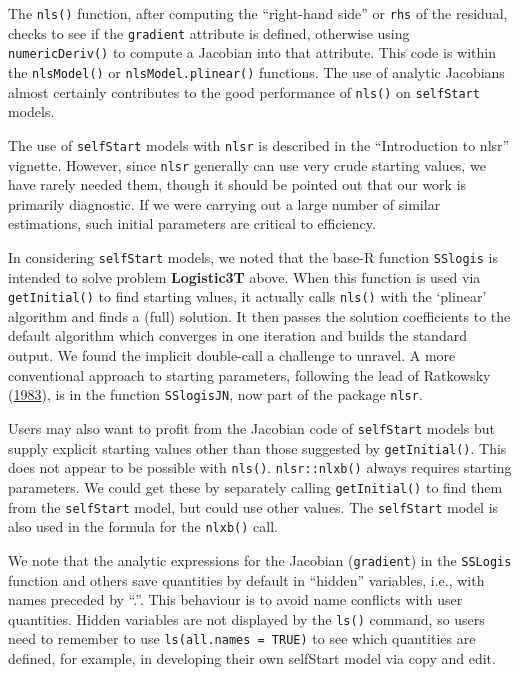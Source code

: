 \documentclass[
]{article}
\begin{document}
The \texttt{nls()} function, after computing the ``right-hand side'' or
\texttt{rhs} of the residual, checks to see if the \texttt{gradient}
attribute is defined, otherwise using \texttt{numericDeriv()} to compute
a Jacobian into that attribute. This code is within the
\texttt{nlsModel()} or \texttt{nlsModel.plinear()} functions. The use of
analytic Jacobians almost certainly contributes to the good performance
of \texttt{nls()} on \texttt{selfStart} models.

The use of \texttt{selfStart} models with \texttt{nlsr} is described in
the ``Introduction to nlsr'' vignette. However, since \texttt{nlsr}
generally can use very crude starting values, we have rarely needed
them, though it should be pointed out that our work is primarily
diagnostic. If we were carrying out a large number of similar
estimations, such initial parameters are critical to efficiency.

In considering \texttt{selfStart} models, we noted that the base-R
function \texttt{SSlogis} is intended to solve problem
\textbf{Logistic3T} above. When this function is used via
\texttt{getInitial()} to find starting values, it actually calls
\texttt{nls()} with the `plinear' algorithm and finds a (full) solution.
It then passes the solution coefficients to the default algorithm which
converges in one iteration and builds the standard output. We found the
implicit double-call a challenge to unravel. A more conventional
approach to starting parameters, following the lead of Ratkowsky
(\protect\hyperlink{ref-Ratkowsky1983}{1983}), is in the function
\texttt{SSlogisJN}, now part of the package \texttt{nlsr}.

Users may also want to profit from the Jacobian code of
\texttt{selfStart} models but supply explicit starting values other than
those suggested by \texttt{getInitial()}. This does not appear to be
possible with \texttt{nls()}. \texttt{nlsr::nlxb()} always requires
starting parameters. We could get these by separately calling
\texttt{getInitial()} to find them from the \texttt{selfStart} model,
but could use other values. The \texttt{selfStart} model is also used in
the formula for the \texttt{nlxb()} call.

We note that the analytic expressions for the Jacobian
(\texttt{gradient}) in the \texttt{SSLogis} function and others save
quantities by default in ``hidden'' variables, i.e., with names preceded
by ``.''. This behaviour is to avoid name conflicts with user
quantities. Hidden variables are not displayed by the \texttt{ls()}
command, so users need to remember to use
\texttt{ls(all.names\ =\ TRUE)} to see which quantities are defined, for
example, in developing their own selfStart model via copy and edit.
\end{document}
